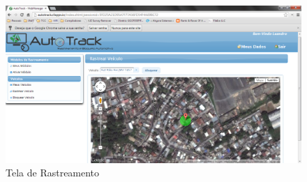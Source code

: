 \begin{figure}[!htb]
	\centering
	\includegraphics[width=15.00cm\textwidth]{figures/webmanager_rastrear.png}
	\caption{Tela de Rastreamento}
	\label{Figura 15}
\end{figure}

\hfill

